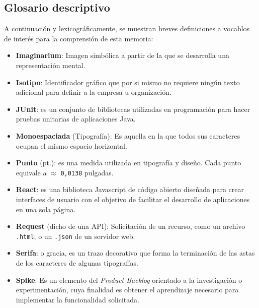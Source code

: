 \documentclass[../ei103948-project-documentation.tex]{subfiles}
\begin{document}
\subsection{Glosario descriptivo}
        A continuación y lexicográficamente, se muestran breves definiciones a vocablos de interés para la comprensión de esta memoria:
    \begin{itemize}
        \item \textbf{Imaginarium}: Imagen simbólica a partir de la que se desarrolla una representación mental.
        \item \textbf{Isotipo}: Identificador gráfico que por si mismo no requiere ningún texto adicional para definir a la empresa u organización.
        \item \textbf{JUnit}: es un conjunto de bibliotecas utilizadas en programación para hacer pruebas unitarias de aplicaciones Java.
        \item \textbf{Monoespaciada} (Tipografía): Es aquella en la que todos sus caracteres ocupan el mismo espacio horizontal.
        \item \textbf{Punto} (pt.): es una medida utilizada en tipografía y diseño. Cada punto equivale a $\approx$ \texttt{0,0138} pulgadas.
        \item \textbf{React}: es una biblioteca Javascript de código abierto diseñada para crear interfaces de usuario con el objetivo de facilitar el desarrollo de aplicaciones en una sola página.
        \item \textbf{Request} (dicho de una API): Solicitación de un recurso, como un archivo \texttt{.html}, o un \texttt{.json} de un servidor web.
        \item \textbf{Serifa}: o gracia, es un trazo decorativo que forma la terminación de las astas de los caracteres de algunas tipografías. 
        \item \textbf{Spike}: Es un elemento del \textit{Product Backlog} orientado a la investigación o experimentación, cuya finalidad es obtener el aprendizaje necesario para implementar la funcionalidad solicitada.
    \end{itemize}
\end{document}
